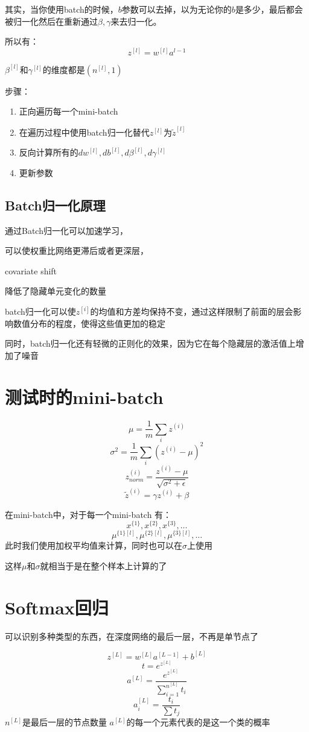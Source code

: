 \documentclass[UTF8]{ctexrep}
\begin{document}
其实，当你使用batch的时候，$b$参数可以去掉，以为无论你的$b$是多少，最后都会被归一化然后在重新通过$\beta,\gamma$来去归一化。

所以有：
$$z^{[l]}=w^{[l]}a^{l-1}$$

$\beta^{[l]}$和$\gamma^{[l]}$的维度都是$(n^{[l]},1)$

步骤：
\begin{enumerate}
    \item 正向遍历每一个mini-batch
    \item 在遍历过程中使用batch归一化替代$z^{[l]}$为$\tilde z^{[l]}$
    \item 反向计算所有的$dw^{[l]},db^{[l]},d\beta^{[l]},d\gamma^{[l]}$
    \item 更新参数
\end{enumerate}
\subsection{Batch归一化原理}
通过Batch归一化可以加速学习，

可以使权重比网络更滞后或者更深层，

covariate shift

降低了隐藏单元变化的数量

batch归一化可以使$z^{[i]}$的均值和方差均保持不变，通过这样限制了前面的层会影响数值分布的程度，使得这些值更加的稳定

同时，batch归一化还有轻微的正则化的效果，因为它在每个隐藏层的激活值上增加了噪音
\section{测试时的mini-batch}
$$\mu = \frac1m\sum_iz^{(i)}$$
$$\sigma^2=\frac1m\sum_i(z^{(i)}-\mu)^2$$
$$z_{norm}^{(i)}=\frac{z^{(i)}-\mu}{\sqrt{\sigma^2+\epsilon}}$$
$$\tilde z^{(i)}=\gamma z^{(i)} + \beta$$

在mini-batch中，对于每一个mini-batch 有：
$$x^{\{1\}},x^{\{2\}},x^{\{3\}},\dots$$
$$\mu^{\{1\}[l]},\mu^{\{2\}[l]},\mu^{\{3\}[l]},\dots$$
此时我们使用加权平均值来计算，同时也可以在$\sigma$上使用

这样$\mu$和$\sigma$就相当于是在整个样本上计算的了

\section{Softmax回归}
可以识别多种类型的东西，在深度网络的最后一层，不再是单节点了

$$z^{[L]}=w^{[L]}a^{[L-1]}+b^{[L]}$$
$$t = e^{z^{[L]}}$$
$$a^{[L]}=\frac{e^{z^{[L]}}}{\sum_{i=1}^{n^{[L]}}t_i}$$
$$a^{[L]}_i=\frac{t_i}{\sum t_j}$$
$n^{[L]}$是最后一层的节点数量
$a^{[L]}$的每一个元素代表的是这一个类的概率
\end{document}
